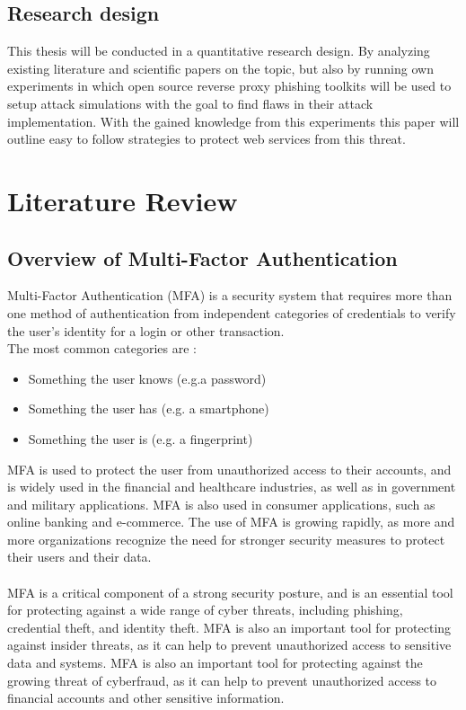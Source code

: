 \documentclass[12pt]{scrbook}
\begin{document}
\section{Research design} This thesis will be conducted in a quantitative
research design. By analyzing existing literature and scientific papers on the
topic, but also by running own experiments in which open source reverse proxy
phishing toolkits will be used to setup attack simulations with the goal to find
flaws in their attack implementation. With the gained knowledge from this
experiments this paper will outline easy to follow strategies to protect web
services from this threat.

\newpage \chapter{Literature Review} \section{Overview of Multi-Factor
Authentication}

Multi-Factor Authentication (MFA) is a security system that requires more than
one method of authentication from independent categories of credentials to
verify the user's identity for a login or other transaction.\\The most common
categories are \cite{mfa}:
\begin{itemize}
  \item Something the user knows (e.g.a password)
  \item Something the user has (e.g. a smartphone)
  \item Something the user is (e.g. a fingerprint)
\end{itemize}

MFA is used to
protect the user from unauthorized access to their accounts, and is widely
used in the financial and healthcare industries, as well as in government and
military applications. MFA is also used in consumer applications, such as
online banking and e-commerce. The use of MFA is growing rapidly, as more and
more organizations recognize the need for stronger security measures to
protect their users and their data.\\ \\MFA is a critical component of a
strong security posture, and is an essential tool for protecting against a
wide range of cyber threats, including phishing, credential theft, and
identity theft. MFA is also an important tool for protecting against insider
threats, as it can help to prevent unauthorized access to sensitive data and
systems. MFA is also an important tool for protecting against the growing
threat of cyberfraud, as it can help to prevent unauthorized access to
financial accounts and other sensitive information.
\end{document}
